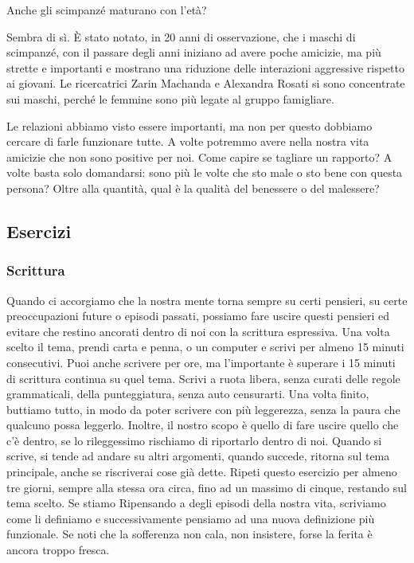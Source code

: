 \documentclass[12pt]{book} %
\begin{document}
\begin{mdframed}[linewidth=1pt]
Anche gli scimpanzé maturano con l'età? 

Sembra di sì. È stato notato, in 20 anni di
osservazione, che i maschi di scimpanzé, con il passare degli anni iniziano ad avere poche amicizie, ma più strette e
importanti e mostrano una riduzione delle interazioni aggressive rispetto ai giovani. Le ricercatrici Zarin Machanda e Alexandra Rosati si sono concentrate sui maschi, perché le femmine sono più legate al gruppo famigliare. 
\end{mdframed}

Le relazioni abbiamo visto essere importanti, ma non per questo dobbiamo cercare di farle funzionare tutte. A
volte potremmo avere nella nostra vita amicizie che non sono positive per noi.
Come capire se tagliare un rapporto? A volte basta solo domandarsi: sono più le volte che sto male o sto bene con questa persona? Oltre alla quantità, qual è la qualità del benessere o del malessere?

\subsection{Esercizi}
\subsubsection{Scrittura}
Quando ci accorgiamo che la nostra mente torna sempre su certi pensieri, su certe preoccupazioni future o episodi passati, possiamo fare uscire questi pensieri ed evitare che restino ancorati dentro di noi con la scrittura espressiva. Una volta scelto il tema, prendi carta e penna, o un computer e scrivi per almeno 15 minuti consecutivi.
Puoi anche scrivere per ore, ma l'importante è superare i 15 minuti di scrittura continua su quel tema. Scrivi a ruota libera, senza curati delle regole grammaticali, della punteggiatura, senza auto censurarti. Una volta finito, buttiamo tutto, in modo da poter scrivere con più leggerezza, senza la paura che qualcuno possa leggerlo.
Inoltre, il nostro scopo è quello di fare uscire quello che c'è dentro, se lo rileggessimo rischiamo di riportarlo dentro di noi. 
Quando si scrive, si tende ad andare su altri argomenti, quando succede, ritorna sul tema principale, anche se riscriverai cose già dette. Ripeti questo esercizio per almeno tre giorni, sempre alla stessa ora circa, fino ad un massimo di cinque, restando sul tema scelto. 
Se stiamo Ripensando a degli episodi della nostra vita, scriviamo come li definiamo e successivamente pensiamo ad una nuova definizione più funzionale. 
Se noti che la sofferenza non cala, non insistere, forse la ferita è ancora troppo fresca.
\end{document}
